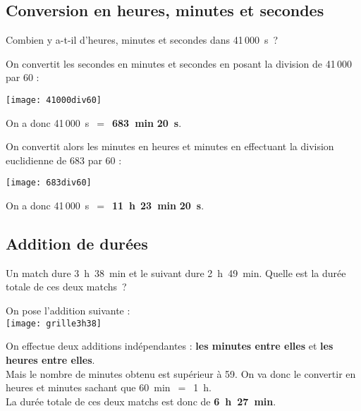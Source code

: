 \begin{methode*1}
\subsection{Conversion en heures, minutes et secondes}

\begin{exemple*1}
Combien y a-t-il d'heures, minutes et secondes dans 41\,000 s ? \\[1em]
\begin{minipage}[t]{.46\textwidth}
On convertit les secondes en minutes et secondes en posant la division de 41\,000 par 60 :

\begin{center}\texttt{[image: 41000div60]} \end{center}

On a donc 41\,000 s $=$ \textcolor{rose}{\textbf{683 min}} \textcolor{vert}{\textbf{20 s}}.
\end{minipage}\hfill%
\begin{minipage}[t]{.46\textwidth}
On convertit alors les minutes en heures et minutes en effectuant la division euclidienne de 683 par 60 :

\begin{center}\texttt{[image: 683div60]} \end{center}
On a donc 41\,000 s $=$ \textcolor{bleu}{\textbf{11 h}} \textcolor{rose}{\textbf{23 min}} \textcolor{vert}{\textbf{20 s}}.
\end{minipage}


\end{exemple*1}


\subsection{Addition de durées}

\begin{exemple*1}
Un match dure 3 h 38 min et le suivant dure 2 h 49 min. Quelle est la durée totale de ces deux matchs ? \\[1em]
\begin{minipage}[t]{.34\textwidth}
On pose l'addition suivante :\\[0.2em]

\texttt{[image: grille3h38]}
\end{minipage}\hfill%
\begin{minipage}[t]{.60\textwidth}
On effectue deux additions indépendantes : 
\textcolor{vert}{\textbf{les minutes entre elles}} et \textcolor{bleu}{\textbf{les heures entre elles}}.\\[0.75em]
Mais le nombre de minutes obtenu est supérieur à 59. 
On va donc le convertir en heures et minutes sachant que 60 min $=$ 1 h. \\[0.75em]
La durée totale de ces deux matchs est donc de \textcolor{rose}{\textbf{6 h 27 min}}.
\end{minipage}


\end{exemple*1}
\end{methode*1}
